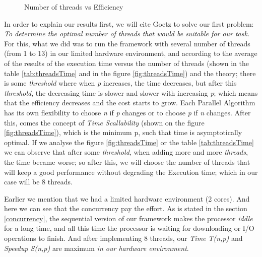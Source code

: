 \begin{figure}\centering
	\caption{Number of threads vs Efficiency}\label{fig:threadsEfficiency}
\end{figure}


In order to explain our results first, we will cite Goetz \cite{SF2008} to solve our first problem: \emph{To determine the optimal number of threads that would be suitable for our task.}   For this, what we did was to run the framework with several number of threads (from 1 to 13) in our limited hardware environment, and according to the average of the results of the execution time versus the number of threads (shown in the table \ref{tab:threadsTime} and in the figure \ref{fig:threadsTime}) and the theory; there is some \emph{threshold} \cite%
{T2011} where when \emph{p} increases, the time decreases, but after this \emph{threshold}, the decreasing time is slower and slower with increasing \emph{p}; which means that the efficiency decreases and the cost starts to grow. Each Parallel Algorithm has its own flexibility to choose \emph{n} if \emph{p} changes or to choose \emph{p} if \emph{n} changes. After this, comes the concept of \emph{Time Scallability} (shown on the figure \ref{fig:threadsTime}), which is the minimum p, such that time is asymptotically optimal. If we analyse the figure \ref{fig:threadsTime} or the table \ref{tab:threadsTime} we can observe that after some \emph{threshold}, when adding more and more \emph{threads}, the time became worse; so after this, we will choose the number of threads that will keep a good performance without degrading the Execution time; which in our case will be 8 threads. 

Earlier we mention that we had a limited hardware environment (2 cores). And here we can see that the concurrency pay the effort. As is stated in the section \ref{concurrency}, the sequential version of our framework makes the processor \emph{iddle} for a long time, and all this time the processor is waiting for downloading or I/O operations to finish. And after implementing 8 threads, our \emph{Time T(n,p)} and \emph{Speedup S(n,p)} are maximum \emph{in our hardware environment}. 

